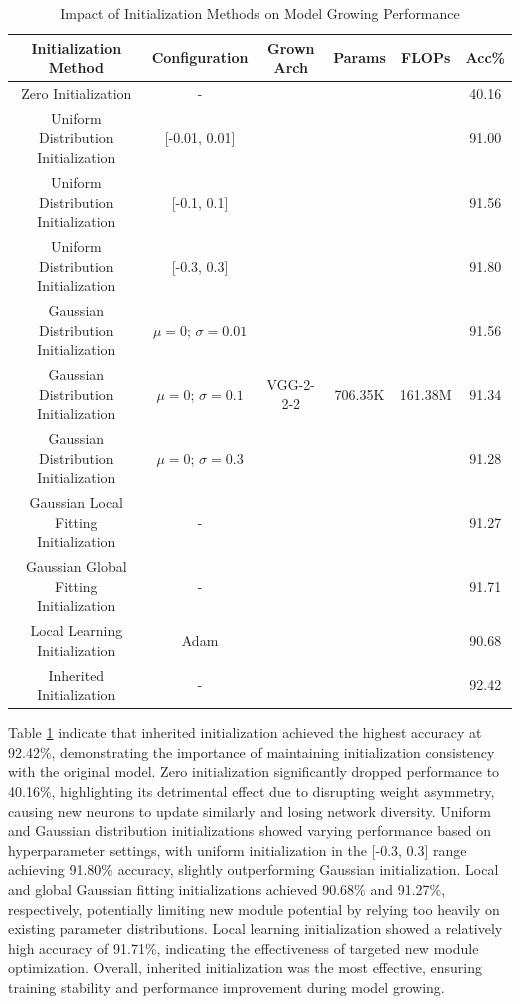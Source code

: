 \documentclass[preprint,12pt]{elsarticle}
\begin{document}
\begin{table}[ht]
\centering
\tiny
\renewcommand{\arraystretch}{1.3}
\begin{adjustbox}{center}
\begin{tabular}{c|c|c|c|c|c}
\hline
\textbf{Initialization Method} & \textbf{Configuration} & \textbf{Grown Arch} & \textbf{Params} & \textbf{FLOPs} & \textbf{Acc\%} \\
\hline
Zero Initialization & - & \multirow{11}{*}{VGG-2-2-2} & \multirow{11}{*}{706.35K} & \multirow{11}{*}{161.38M} & 40.16 \\
Uniform Distribution Initialization & [-0.01, 0.01] & & & & 91.00 \\
Uniform Distribution Initialization & [-0.1, 0.1] & & & & 91.56 \\
Uniform Distribution Initialization & [-0.3, 0.3] & & & & 91.80 \\
Gaussian Distribution Initialization & $\mu=0$; $\sigma=0.01$ & & & & 91.56 \\
Gaussian Distribution Initialization & $\mu=0$; $\sigma=0.1$ & & & & 91.34 \\
Gaussian Distribution Initialization & $\mu=0$; $\sigma=0.3$ & & & & 91.28 \\
Gaussian Local Fitting Initialization & - & & & & 91.27 \\
Gaussian Global Fitting Initialization & - & & & & 91.71 \\
Local Learning Initialization & Adam & & & & 90.68 \\
Inherited Initialization & - & & & & 92.42 \\
\hline
\end{tabular}
\end{adjustbox}
\caption{Impact of Initialization Methods on Model Growing Performance}
\label{table:initialization_methods}
\end{table}


Table \ref{table:initialization_methods} indicate that inherited initialization achieved the highest accuracy at 92.42\%, demonstrating the importance of maintaining initialization consistency with the original model. Zero initialization significantly dropped performance to 40.16\%, highlighting its detrimental effect due to disrupting weight asymmetry, causing new neurons to update similarly and losing network diversity. Uniform and Gaussian distribution initializations showed varying performance based on hyperparameter settings, with uniform initialization in the [-0.3, 0.3] range achieving 91.80\% accuracy, slightly outperforming Gaussian initialization. Local and global Gaussian fitting initializations achieved 90.68\% and 91.27\%, respectively, potentially limiting new module potential by relying too heavily on existing parameter distributions. Local learning initialization showed a relatively high accuracy of 91.71\%, indicating the effectiveness of targeted new module optimization. Overall, inherited initialization was the most effective, ensuring training stability and performance improvement during model growing.
\end{document}

